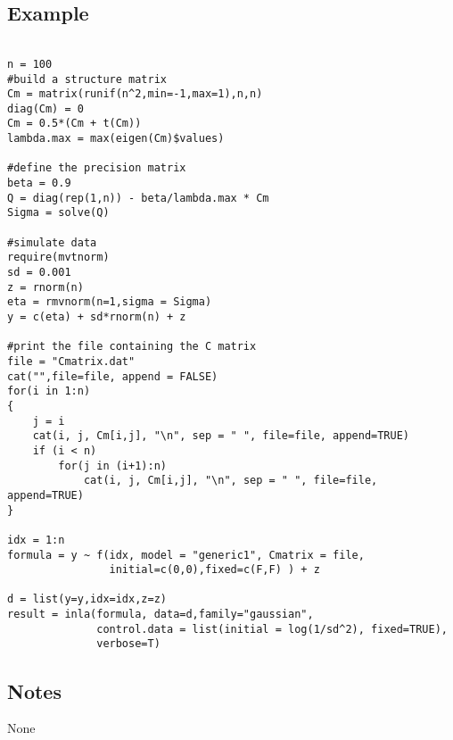 \documentclass[a4paper,11pt]{article}
\begin{document}
\subsection*{Example}
\begin{verbatim}

n = 100
#build a structure matrix
Cm = matrix(runif(n^2,min=-1,max=1),n,n)
diag(Cm) = 0
Cm = 0.5*(Cm + t(Cm))
lambda.max = max(eigen(Cm)$values)

#define the precision matrix
beta = 0.9
Q = diag(rep(1,n)) - beta/lambda.max * Cm
Sigma = solve(Q)

#simulate data
require(mvtnorm)
sd = 0.001
z = rnorm(n)
eta = rmvnorm(n=1,sigma = Sigma)
y = c(eta) + sd*rnorm(n) + z

#print the file containing the C matrix
file = "Cmatrix.dat"
cat("",file=file, append = FALSE)
for(i in 1:n)
{
    j = i
    cat(i, j, Cm[i,j], "\n", sep = " ", file=file, append=TRUE)
    if (i < n)
        for(j in (i+1):n)
            cat(i, j, Cm[i,j], "\n", sep = " ", file=file, append=TRUE)
}

idx = 1:n
formula = y ~ f(idx, model = "generic1", Cmatrix = file,
                initial=c(0,0),fixed=c(F,F) ) + z

d = list(y=y,idx=idx,z=z)
result = inla(formula, data=d,family="gaussian",
              control.data = list(initial = log(1/sd^2), fixed=TRUE),
              verbose=T)

\end{verbatim}

\subsection*{Notes}
None
\end{document}
